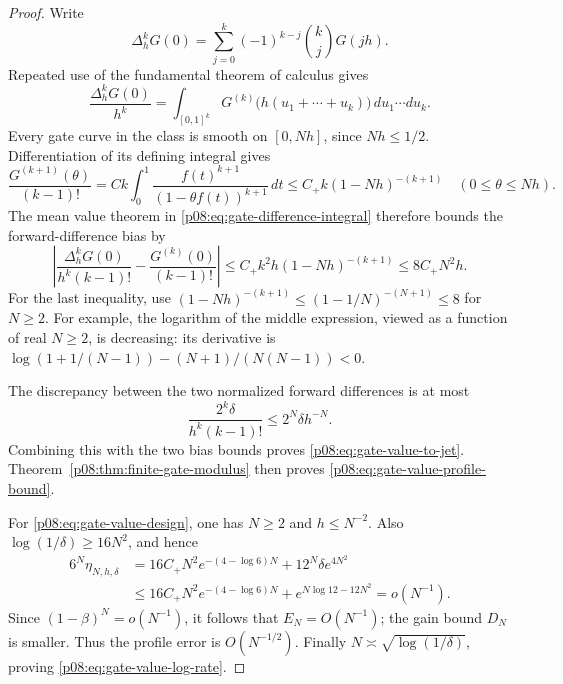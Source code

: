 \documentclass[11pt,letterpaper]{article}
\theoremstyle{definition}
\theoremstyle{remark}
\newcommand{\1}{\mathbf 1}
\begin{document}
\begin{proof}
Write
\[
 \Delta_h^k G(0)
 =\sum_{j=0}^k(-1)^{k-j}\binom kj G(jh).
\]
Repeated use of the fundamental theorem of calculus gives
\begin{equation}\label{p08:eq:gate-difference-integral}
 \frac{\Delta_h^kG(0)}{h^k}
 =\int_{[0,1]^k}G^{(k)}\bigl(h(u_1+\cdots+u_k)\bigr)
          \,du_1\cdots du_k.
\end{equation}
Every gate curve in the class is smooth on $[0,Nh]$, since $Nh\leq1/2$.
Differentiation of its defining integral gives
\[
 \frac{G^{(k+1)}(\theta)}{(k-1)!}
 =Ck\int_0^1\frac{f(t)^{k+1}}{(1-\theta f(t))^{k+1}}\,dt
 \leq C_+k(1-Nh)^{-(k+1)}
 \quad(0\leq\theta\leq Nh).
\]
The mean value theorem in \eqref{p08:eq:gate-difference-integral} therefore
bounds the forward-difference bias by
\begin{equation}\label{p08:eq:gate-difference-bias}
 \left|\frac{\Delta_h^kG(0)}{h^k(k-1)!}
              -\frac{G^{(k)}(0)}{(k-1)!}\right|
 \leq C_+k^2h(1-Nh)^{-(k+1)}\leq8C_+N^2h.
\end{equation}
For the last inequality, use
$(1-Nh)^{-(k+1)}\leq(1-1/N)^{-(N+1)}\leq8$ for $N\geq2$.
For example, the logarithm of the middle expression, viewed as a
function of real $N\geq2$, is decreasing: its derivative is
$\log(1+1/(N-1))-(N+1)/(N(N-1))<0$.

The discrepancy between the two normalized forward differences is at most
\[
 \frac{2^k\delta}{h^k(k-1)!}\leq2^N\delta h^{-N}.
\]
Combining this with the two bias bounds proves
\eqref{p08:eq:gate-value-to-jet}.  Theorem~\ref{p08:thm:finite-gate-modulus}
then proves \eqref{p08:eq:gate-value-profile-bound}.

For \eqref{p08:eq:gate-value-design}, one has $N\geq2$ and $h\leq N^{-2}$.
Also $\log(1/\delta)\geq16N^2$, and hence
\begin{align*}
 6^N\eta_{N,h,\delta}
 &=16C_+N^2e^{-(4-\log6)N}
       +12^N\delta e^{4N^2}\\
 &\leq16C_+N^2e^{-(4-\log6)N}
       +e^{N\log12-12N^2}=o(N^{-1}).
\end{align*}
Since $(1-\beta)^N=o(N^{-1})$, it follows that $E_N=O(N^{-1})$;
the gain bound $D_N$ is smaller.  Thus the profile error is $O(N^{-1/2})$.
Finally $N\asymp\sqrt{\log(1/\delta)}$, proving
\eqref{p08:eq:gate-value-log-rate}.
\end{proof}
\end{document}
